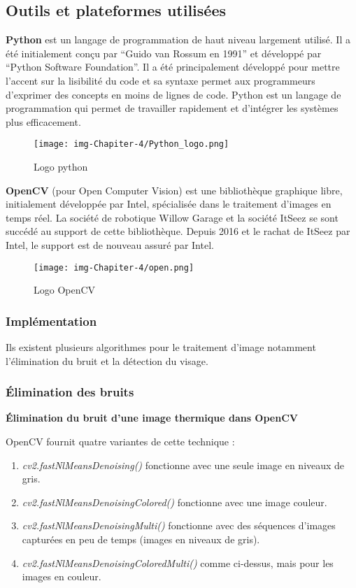 \documentclass[12pt]{article}
\begin{document}
\subsection{Outils et plateformes utilisées}
\textbf{Python} est un langage de programmation de haut niveau largement utilisé. Il a été initialement conçu par “Guido van Rossum en 1991” et développé par “Python Software Foundation”. Il a été principalement développé pour mettre l'accent sur la lisibilité du code et sa syntaxe permet aux programmeurs d'exprimer des concepts en moins de lignes de code. Python est un langage de programmation qui permet de travailler rapidement et d’intégrer les systèmes plus efficacement.

\begin{figure}[h]
	\centering
	\texttt{[image: img-Chapiter-4/Python\_logo.png]}
	\caption{Logo python}
\end{figure}

\textbf{OpenCV} (pour Open Computer Vision) est une bibliothèque graphique libre, initialement développée par Intel, spécialisée dans le traitement d'images en temps réel. La société de robotique Willow Garage et la société ItSeez se sont succédé au support de cette bibliothèque. Depuis 2016 et le rachat de ItSeez par Intel, le support est de nouveau assuré par Intel. 
\newpage
\begin{figure}[h]
	\centering
	\texttt{[image: img-Chapiter-4/open.png]}
	\caption{Logo OpenCV}
\end{figure}

\subsubsection{Implémentation}
Ils existent plusieurs algorithmes pour le traitement d'image notamment l'élimination du bruit et la détection du visage.
\subsubsection*{\' Elimination des bruits}
\textbf{Élimination du bruit  d'une image thermique dans OpenCV}

OpenCV fournit quatre variantes de cette technique :
\begin{enumerate}
	\item \textit{cv2.fastNlMeansDenoising()} fonctionne avec une seule image en niveaux de gris.
	\item \textit{cv2.fastNlMeansDenoisingColored()} fonctionne avec une image couleur.
	\item \textit{cv2.fastNlMeansDenoisingMulti()} fonctionne avec des séquences d'images capturées en peu de temps (images en niveaux de gris).
	\item \textit{cv2.fastNlMeansDenoisingColoredMulti()} comme ci-dessus, mais pour les images en couleur.
\end{enumerate}
\end{document}

